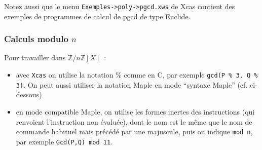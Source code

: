 \documentclass[a4paper,11pt]{article}
\newcommand{\Z}{{\mathbb{Z}}}
\begin{document}
Notez aussi que le menu \verb|Exemples->poly->pgcd.xws| de Xcas contient 
des exemples de programmes de calcul de pgcd de type Euclide.

\subsubsection{Calculs modulo $n$}
Pour travailler dans $\Z/n\Z[X]$~:
\begin{itemize}
\item avec \verb|Xcas| on utilise la notation \% comme en C, par
exemple {\tt gcd(P \% 3, Q \% 3)}. On peut aussi utiliser la notation
Maple en mode ``syntaxe Maple'' (cf. ci-dessous)
\item en mode compatible Maple,
on utilise les formes inertes des instructions (qui renvoient l'instruction
non \'evalu\'ee), dont le nom est le m\^eme que le nom de commande
habituel mais pr\'ec\'ed\'e par une majuscule, puis on indique
\verb|mod n|, par exemple \verb|Gcd(P,Q) mod 11|.
\end{itemize}

\pagebreak
\end{document}

